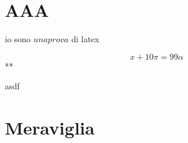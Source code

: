 \section{AAA}
io sono $una prova$ di latex

$$
x+10 \pi = 99 \alpha
$$**

asdf

\section{Meraviglia}
